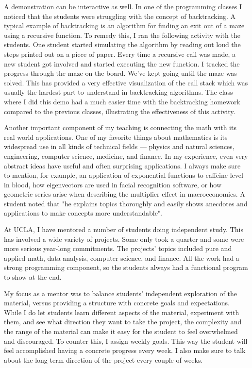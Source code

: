 \documentclass[11pt]{article}
\begin{document}
A demonstration can be interactive as well. In one of the programming classes I noticed that the students were struggling with the concept of backtracking. A typical example of backtracking is an algorithm for finding an exit out of a maze using a recursive function. To remedy this, I ran the following activity with the students. One student started simulating the algorithm by reading out loud the steps printed out on a piece of paper. Every time a recursive call was made, a new student got involved and started executing the new function. I tracked the progress through the maze on the board.
We've kept going until the maze was solved.  This has provided a very effective visualization of the call stack which was usually the hardest part to understand in backtracking algorithms.
The class where I did this demo had a much easier time with the backtracking homework compared to the previous classes, illustrating the effectiveness of this activity.  


Another important component of my teaching is connecting the math with its real world applications. One of my favorite things about mathematics is its widespread use in all kinds of technical fields --- physics and natural sciences, engineering, computer science, medicine, and finance.
In my experience, even very abstract ideas have useful and often surprising applications.
I always make sure to mention, for example, an application of exponential functions to caffeine level in blood, how eigenvectors are used in facial recognition software,
or how geometric series arise when describing the multiplier effect in macroeconomics.
A student noted that "he explains topics thoroughly and easily shows anecdotes and applications to make concepts more understandable".


At UCLA, I have mentored a number of students doing independent study.
This has involved a wide variety of projects. Some only took a quarter and some were more serious year-long commitments.
The projects' topics included pure and applied math, data analysis, computer science, and finance. All the work had a strong programming component, so the students always had a functional program to show at the end.


My focus as a mentor was to balance students' independent exploration of the material, versus providing a structure with concrete goals and expectations. While I do let students learn different aspects of the material, experiment with them, and see what direction they want to take the project, the complexity and the range of the material can make it easy for the student to feel overwhelmed and discouraged. To counter this, I assign weekly goals. This way the student will feel accomplished having a concrete progress every week.  I also make sure to talk about the long term direction of the project every couple of weeks.
\end{document}

